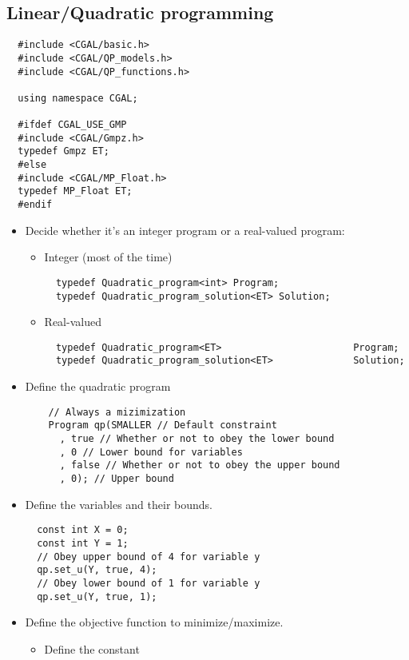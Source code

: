 \documentclass[guide.tex]{subfiles}
\begin{document}
\subsection{Linear/Quadratic programming}
\begin{verbatim}
  #include <CGAL/basic.h>
  #include <CGAL/QP_models.h>
  #include <CGAL/QP_functions.h>

  using namespace CGAL;

  #ifdef CGAL_USE_GMP
  #include <CGAL/Gmpz.h>
  typedef Gmpz ET;
  #else
  #include <CGAL/MP_Float.h>
  typedef MP_Float ET;
  #endif
\end{verbatim}
\begin{itemize}
  \item Decide whether it's an integer program or a real-valued program:
  \begin{itemize}
    \item Integer (most of the time)
\begin{verbatim}
  typedef Quadratic_program<int> Program;
  typedef Quadratic_program_solution<ET> Solution;
\end{verbatim}
    \item Real-valued
\begin{verbatim}
  typedef Quadratic_program<ET>                       Program;
  typedef Quadratic_program_solution<ET>              Solution;
\end{verbatim}
  \end{itemize}
  \item Define the quadratic program
\begin{verbatim}
    // Always a mizimization
    Program qp(SMALLER // Default constraint
      , true // Whether or not to obey the lower bound
      , 0 // Lower bound for variables
      , false // Whether or not to obey the upper bound
      , 0); // Upper bound
\end{verbatim}
  \item Define the variables and their bounds.
\begin{verbatim}
  const int X = 0; 
  const int Y = 1;
  // Obey upper bound of 4 for variable y
  qp.set_u(Y, true, 4);
  // Obey lower bound of 1 for variable y
  qp.set_u(Y, true, 1);
\end{verbatim}
  \item Define the objective function to minimize/maximize.
  \begin{itemize}
    \item  Define the constant
\begin{verbatim}

\end{verbatim}
\end{itemize}
\end{itemize}
\end{document}

